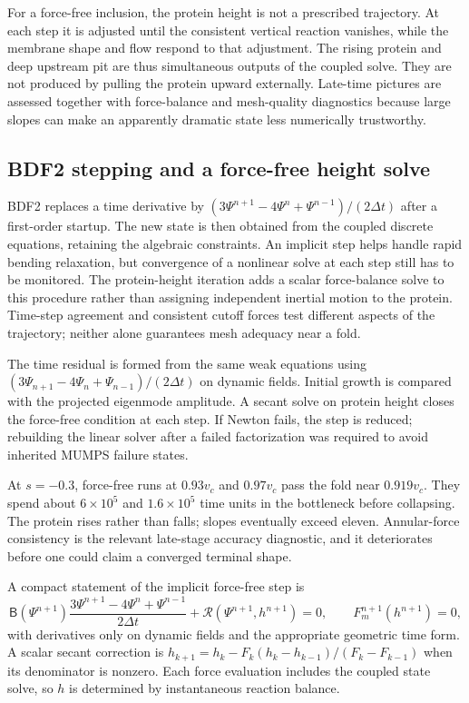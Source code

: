 For a force-free inclusion, the protein height is not a prescribed trajectory. At each step it is adjusted until the consistent vertical reaction vanishes, while the membrane shape and flow respond to that adjustment. The rising protein and deep upstream pit are thus simultaneous outputs of the coupled solve. They are not produced by pulling the protein upward externally. Late-time pictures are assessed together with force-balance and mesh-quality diagnostics because large slopes can make an apparently dramatic state less numerically trustworthy.


\subsection{BDF2 stepping and a force-free height solve}


BDF2 replaces a time derivative by $(3\Psi^{n+1}-4\Psi^n+\Psi^{n-1})/(2\Delta t)$ after a first-order startup. The new state is then obtained from the coupled discrete equations, retaining the algebraic constraints. An implicit step helps handle rapid bending relaxation, but convergence of a nonlinear solve at each step still has to be monitored. The protein-height iteration adds a scalar force-balance solve to this procedure rather than assigning independent inertial motion to the protein. Time-step agreement and consistent cutoff forces test different aspects of the trajectory; neither alone guarantees mesh adequacy near a fold.


The time residual is formed from the same weak equations using $(3\Psi_{n+1}-4\Psi_n+\Psi_{n-1})/(2\Delta t)$ on dynamic fields. Initial growth is compared with the projected eigenmode amplitude. A secant solve on protein height closes the force-free condition at each step. If Newton fails, the step is reduced; rebuilding the linear solver after a failed factorization was required to avoid inherited MUMPS failure states.

At $s=-0.3$, force-free runs at $0.93v_c$ and $0.97v_c$ pass the fold near $0.919v_c$. They spend about $6\times10^5$ and $1.6\times10^5$ time units in the bottleneck before collapsing. The protein rises rather than falls; slopes eventually exceed eleven. Annular-force consistency is the relevant late-stage accuracy diagnostic, and it deteriorates before one could claim a converged terminal shape.


A compact statement of the implicit force-free step is
\begin{equation}
\mathsf B(\Psi^{n+1})\frac{3\Psi^{n+1}-4\Psi^n+\Psi^{n-1}}{2\Delta t}
+\mathcal R(\Psi^{n+1},h^{n+1})=0,
\qquad F_m^{n+1}(h^{n+1})=0,
\label{eq:bdf-forcefree}
\end{equation}
with derivatives only on dynamic fields and the appropriate geometric time form. A scalar secant correction is $h_{k+1}=h_k-F_k(h_k-h_{k-1})/(F_k-F_{k-1})$ when its denominator is nonzero. Each force evaluation includes the coupled state solve, so $h$ is determined by instantaneous reaction balance.

